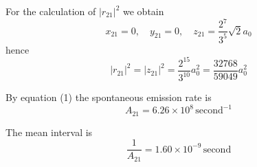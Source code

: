 \documentclass[12pt]{article}
\begin{document}
For the calculation of $|r_{21}|^2$ we obtain
\begin{equation*}
x_{21}=0,
\quad
y_{21}=0,
\quad
z_{21}=\frac{2^7}{3^5}\sqrt2a_0
\end{equation*}
hence
\begin{equation*}
|r_{21}|^2=|z_{21}|^2=\frac{2^{15}}{3^{10}}a_0^2=\frac{32768}{59049}a_0^2
\end{equation*}

By equation (1) the spontaneous emission rate is
\begin{equation*}
A_{21}=6.26\times10^8\,\text{second}^{-1}
\end{equation*}

The mean interval is
\begin{equation*}
\frac{1}{A_{21}}=1.60\times10^{-9}\,\text{second}
\end{equation*}
\end{document}
